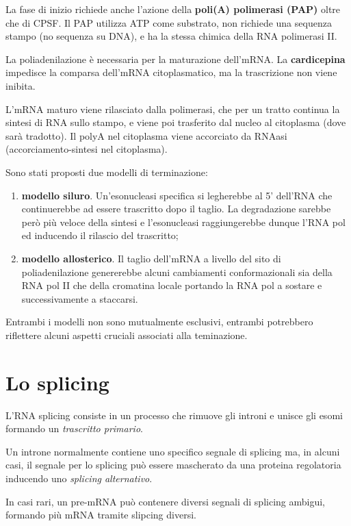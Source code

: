 \documentclass[11pt]{book}
\begin{document}
La fase di inizio richiede anche l'azione della \textbf{poli(A)
polimerasi (PAP)} oltre che di CPSF. Il PAP utilizza ATP come substrato,
non richiede una sequenza stampo (no sequenza su DNA), e ha la stessa
chimica della RNA polimerasi II.

La poliadenilazione è necessaria per la maturazione dell'mRNA. La
\textbf{cardicepina} impedisce la comparsa dell'mRNA citoplasmatico, ma
la trascrizione non viene inibita.

L'mRNA maturo viene rilasciato dalla polimerasi, che per un tratto
continua la sintesi di RNA sullo stampo, e viene poi trasferito dal
nucleo al citoplasma (dove sarà tradotto). Il polyA nel citoplasma viene
accorciato da RNAasi (accorciamento-sintesi nel citoplasma).

Sono stati proposti due modelli di terminazione:

\begin{enumerate}
\def\labelenumi{\arabic{enumi}.}
\itemsep1pt\parskip0pt
\item
  \textbf{modello siluro}. Un'esonucleasi specifica si legherebbe al 5'
  dell'RNA che continuerebbe ad essere trascritto dopo il taglio. La
  degradazione sarebbe però più veloce della sintesi e l'esonucleasi
  raggiungerebbe dunque l'RNA pol ed inducendo il rilascio del
  trascritto;
\item
  \textbf{modello allosterico}. Il taglio dell'mRNA a livello del sito
  di poliadenilazione genererebbe alcuni cambiamenti conformazionali sia
  della RNA pol II che della cromatina locale portando la RNA pol a
  sostare e successivamente a staccarsi.
\end{enumerate}

Entrambi i modelli non sono mutualmente esclusivi, entrambi potrebbero
riflettere alcuni aspetti cruciali associati alla teminazione.

\section{Lo splicing}\label{lo-splicing}

L'RNA splicing consiste in un processo che rimuove gli introni e unisce
gli esomi formando un \emph{trascritto primario}.

Un introne normalmente contiene uno specifico segnale di splicing ma, in
alcuni casi, il segnale per lo splicing può essere mascherato da una
proteina regolatoria inducendo uno \emph{splicing alternativo}.

In casi rari, un pre-mRNA può contenere diversi segnali di splicing
ambigui, formando più mRNA tramite slipcing diversi.
\end{document}
